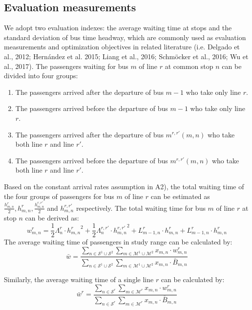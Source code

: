 \documentclass[smallextended]{svjour3}       %
\begin{document}
\begin{Abstract}
\subsection{Evaluation measurements}
We adopt two evaluation indexes: 
the average waiting time at stops and the standard deviation of bus time headway, which are commonly used 
as evaluation measurements and optimization objectives in related literature (i.e. Delgado et al., 2012; Hernández et al. 2015; Liang et al., 2016; Schmöcker et al., 2016; Wu et al., 2017).
The passengers waiting for bus $m$ of line $r$ at common stop $n$ can be divided into four groups:
\begin{enumerate}[1)]
    \item The passengers arrived after the departure of bus $m-1$ who take only line $r$.
    \item The passengers arrived before the departure of bus $m-1$ who take only line $r$.
    \item The passengers arrived after the departure of bus $m^{r,r'}(m,n)$ who take both line $r$ and line $r'$.
    \item The passengers arrived before the departure of bus $m^{r,r'}(m,n)$ who take both line $r$ and line $r'$.
\end{enumerate} 

Based on the constant arrival rates assumption in A2), 
the total waiting time of the four groups of passengers for bus $m$ of line $r$ can be estimated 
as $\frac{h_{m,n}^{r}}{2},h_{m,n}^{r},\frac{h_{m,n}^{r,r'}}{2}$ and $h_{m,n}^{r,r'}$ respectively. 
The total waiting time for bus $m$ of line $r$ at stop $n$ can be derived as: 
\begin{equation}
    w_{m,n}^{r} = \frac{1}{2}\Lambda_{n}^{r}\cdot {h_{m,n}^{r}}^{2} + \frac{1}{2}\Lambda_{n}^{r,r'}\cdot {h_{m,n}^{r,r'}}^{2}
    + L_{m-1,n}^{r} \cdot h_{m,n}^{r} + L_{m-1,n}^{r} \cdot h_{m,n}^{r}
\end{equation}
The average waiting time of passengers in study range can be calculated by: 
\begin{equation}
    \bar{w} = \frac{\sum\limits_{n\in \mathcal{S}^{1}\cup\mathcal{S}^{2}}\sum\limits_{m\in \mathcal{M}^{1}\cup\mathcal{M}^{2}} x_{m,n}\cdot w_{m,n}^{r}}
    {\sum\limits_{n\in \mathcal{S}^{1}\cup \mathcal{S}^{2}} \sum\limits_{m\in \mathcal{M}^{1}\cup \mathcal{M}^{2}}x_{m,n}\cdot \bar{B}_{m,n}}
\end{equation}

Similarly, the average waiting time of a single line $r$ can be calculated by:
\begin{equation}
    \bar{w}^{r} = \frac{\sum\limits_{n\in \mathcal{S}^{r}}\sum\limits_{m\in \mathcal{M}^{r}} x_{m,n}\cdot w_{m,n}^{r}}
    {\sum\limits_{n\in \mathcal{S}^{r}} \sum\limits_{m\in \mathcal{M}^{r}}x_{m,n}\cdot \bar{B}_{m,n}}
\end{equation}


\end{Abstract}
\end{document}

